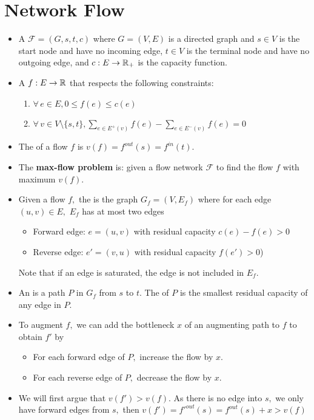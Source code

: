 \documentclass[a4paper,12pt]{article}
\begin{document}
\section{Network Flow}
\begin{itemize}
    \item A  $\mathcal F=(G,s,t,c)$ where $G=(V,E)$ is a directed graph and $s\in V$ is the start node and have no incoming edge, $t\in V$ is the terminal node and have no outgoing edge, and $c:E\to\mathbb{R}_+$ is the capacity function.
    \item A  $f:E\to\mathbb{R}$ that respects the following constraints:\begin{enumerate}
        \item $\forall\,e\in E,0\leq f(e)\leq c(e)$
        \item $\forall\,v\in V\setminus\{s,t\},\sum_{e\in E^+(v)}f(e)-\sum_{e\in E^-(v)}f(e)=0$
    \end{enumerate}
    \item The  of a flow $f$ is $v(f)=f^{out}(s)=f^{in}(t).$
    \item The \textbf{max-flow problem} is: given a flow network $\mathcal F$ to find the flow $f$ with maximum $v(f).$
    \item Given a flow $f,$ the  is the graph $G_f=(V,E_f)$ where for each edge $(u,v)\in E,$ $E_f$ has at most two edges \begin{itemize}
        \item Forward edge: $e=(u,v)$ with residual capacity $c(e)-f(e)>0$
        \item Reverse edge: $e'=(v,u)$ with residual capacity $f(e')>0$) 
    \end{itemize}
    Note that if an edge is saturated, the edge is not included in $E_f.$
    \item An  is a path $P$ in $G_f$ from $s$ to $t.$ The  of $P$ is the smallest residual capacity of any edge in $P.$
    \item To augment $f,$ we can add the bottleneck $x$ of an augmenting path to $f$ to obtain $f'$ by \begin{itemize}
        \item For each forward edge of $P,$ increase the flow by $x.$
        \item For each reverse edge of $P,$ decrease the flow by $x.$
    \end{itemize}
    \item We will first argue that $v(f')>v(f).$ As there is no edge into $s,$ we only have forward edges from $s,$ then $v(f')=f'^{out}(s)=f^{out}(s)+x>v(f)$

\end{itemize}
\end{document}
